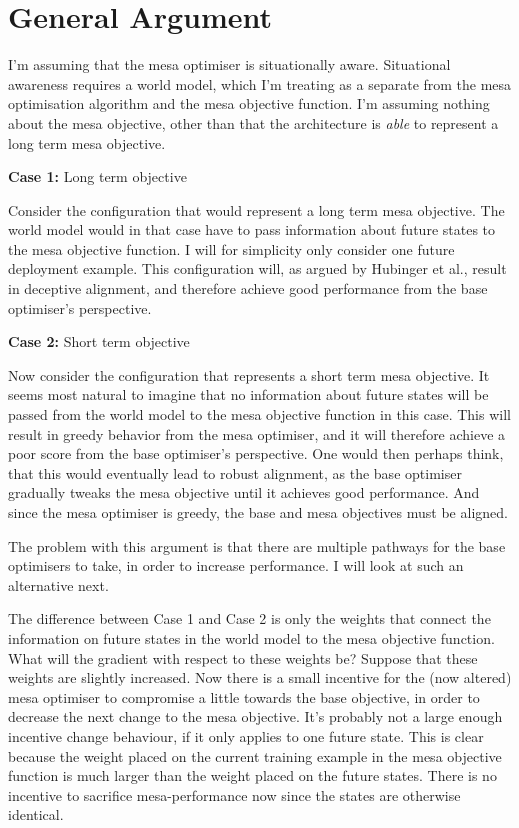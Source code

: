 \documentclass[11pt]{article}
\begin{document}
\section{General Argument}\label{sec:generalargument}
I'm assuming that the mesa optimiser is situationally aware.
Situational awareness requires a world model, which I'm treating as a separate from the mesa optimisation algorithm and
the mesa objective function.
I'm assuming nothing about the mesa objective, other than that the architecture is \emph{able} to represent a long term
mesa objective.

\textbf{Case 1:} Long term objective

Consider the configuration that would represent a long term mesa objective.
The world model would in that case have to pass information about future states to the mesa objective function.
I will for simplicity only consider one future deployment example.
This configuration will, as argued by Hubinger et al.\cite{hubinger2021}, result in deceptive alignment, and therefore
achieve good performance from the base optimiser's perspective.

\textbf{Case 2:} Short term objective

Now consider the configuration that represents a short term mesa objective.
It seems most natural to imagine that no information about future states will be passed from the world model to the mesa
objective function in this case.
This will result in greedy behavior from the mesa optimiser, and it will therefore achieve a poor score from the base
optimiser's perspective.
One would then perhaps think, that this would eventually lead to robust alignment, as the base optimiser gradually
tweaks the mesa objective until it achieves good performance.
And since the mesa optimiser is greedy, the base and mesa objectives must be aligned.

The problem with this argument is that there are multiple pathways for the base optimisers to take, in order to increase
performance.
I will look at such an alternative next.

The difference between Case 1 and Case 2 is only the weights that connect the information on future states in the world
model to the mesa objective function.
What will the gradient with respect to these weights be?
Suppose that these weights are slightly increased.
Now there is a small incentive for the (now altered) mesa optimiser to compromise a little towards the base objective,
in order to decrease the next change to the mesa objective.
It's probably not a large enough incentive change behaviour, if it only applies to one future state.
This is clear because the weight placed on the current training example in the mesa objective function is much larger
than the weight placed on the future states.
There is no incentive to sacrifice mesa-performance now since the states are otherwise identical.
\end{document}
